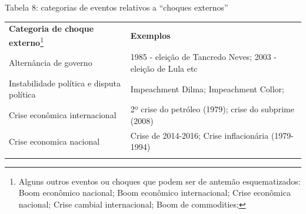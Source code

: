 Tabela 8: categorias de eventos relativos a ``choques externos''

\begin{longtable}[]{@{}
  >{\raggedright\arraybackslash}p{}
  >{\raggedright\arraybackslash}p{}@{}}
\toprule\noalign{}
\begin{minipage}[b]{\linewidth}\raggedright
\textbf{Categoria de choque externo}\footnote{Alguns outros eventos ou
  choques que podem ser de antemão esquematizados: Boom econômico
  nacional; Boom econômico internacional; Crise econômica nacional;
  Crise cambial internacional; Boom de commodities;}
\end{minipage} & \begin{minipage}[b]{\linewidth}\raggedright
\textbf{Exemplos}
\end{minipage} \\
\begin{minipage}[b]{\linewidth}\raggedright
Alternância de governo
\end{minipage} & \begin{minipage}[b]{\linewidth}\raggedright
1985 - eleição de Tancredo Neves; 2003 - eleição de Lula etc
\end{minipage} \\
\begin{minipage}[b]{\linewidth}\raggedright
Instabilidade política e disputa política
\end{minipage} & \begin{minipage}[b]{\linewidth}\raggedright
Impeachment Dilma; Impeachment Collor;
\end{minipage} \\
\begin{minipage}[b]{\linewidth}\raggedright
Crise econômica internacional
\end{minipage} & \begin{minipage}[b]{\linewidth}\raggedright
2º crise do petróleo (1979); crise do subprime (2008)
\end{minipage} \\
\begin{minipage}[b]{\linewidth}\raggedright
Crise economica nacional
\end{minipage} & \begin{minipage}[b]{\linewidth}\raggedright
Crise de 2014-2016; Crise inflacionária (1979-1994)
\end{minipage} \\
\begin{minipage}[b]{\linewidth}\raggedright

\end{minipage}
\end{longtable}

